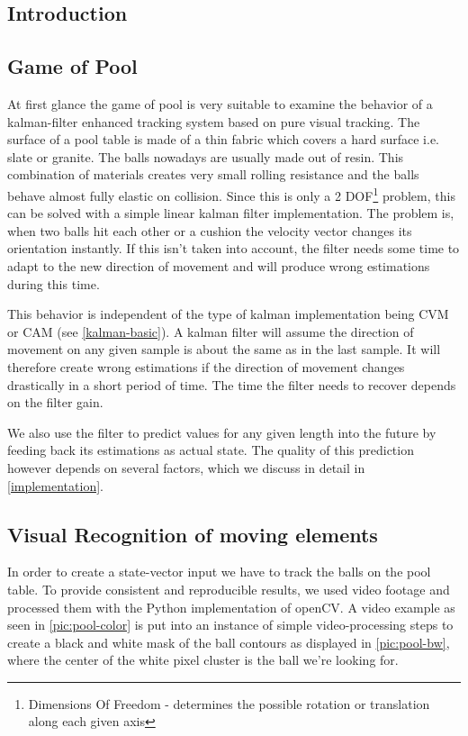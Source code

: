 \documentclass[notitlepage, a4paper, 11pt]{scrartcl}
\begin{document}
\begin{multicols}{2}
\section{Introduction}

\subsection{Game of Pool} \label{intro}

At first glance the game of pool is very suitable to examine the behavior of a kalman-filter enhanced tracking system based on pure visual tracking. 
The surface of a pool table is made of a thin fabric which covers a hard surface i.e. slate or granite.
The balls nowadays are usually made out of resin. This combination of materials creates very small rolling resistance and the balls behave almost fully elastic on collision.
Since this is only a 2 DOF\footnote{Dimensions Of Freedom - determines the possible rotation or translation along each given axis} problem, this can be solved with a simple linear kalman filter implementation. 
The problem is, when two balls hit each other or a cushion the velocity vector changes its orientation instantly. 
If this isn't taken into account, the filter needs some time to adapt to the new direction of movement and will produce wrong estimations during this time.

This behavior is independent of the type of kalman implementation being CVM or CAM (see \cref{kalman-basic}).
A kalman filter will assume the direction of movement on any given sample is about the same as in the last sample. 
It will therefore create wrong estimations if the direction of movement changes drastically in a short period of time. The time the filter needs to recover depends on the filter gain.

We also use the filter to predict values for any given length into the future by feeding back its estimations as actual state. 
The quality of this prediction however depends on several factors, which we discuss in detail in \cref{implementation}.

\subsection{Visual Recognition of moving elements}

In order to create a state-vector input we have to track the balls on the pool table. 
To provide consistent and reproducible results, we used video footage and processed them with the Python implementation of openCV.
A video example as seen in \cref{pic:pool-color} is put into an instance of simple video-processing steps to create a black and white mask of the ball contours as displayed in \cref{pic:pool-bw},
where the center of the white pixel cluster is the ball we're looking for.


\end{multicols}
\end{document}
